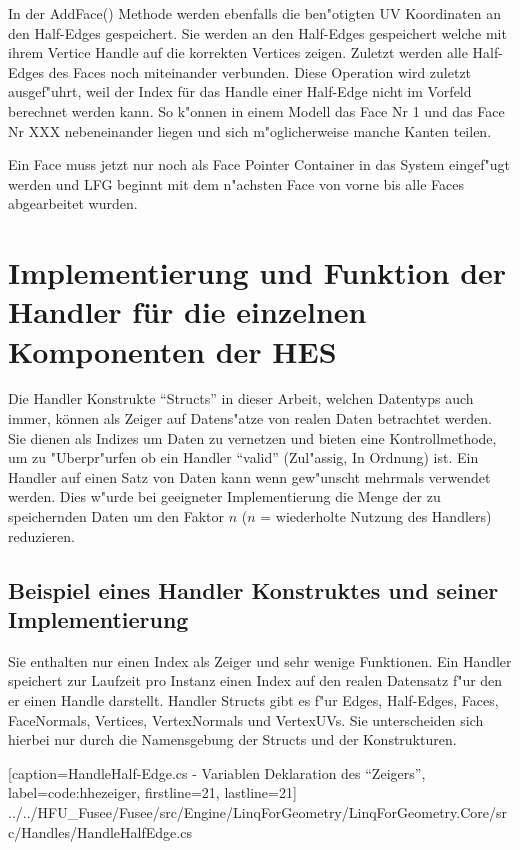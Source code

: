 \documentclass[pagesize, paper=a4, fontsize=12pt,titlepage=true, headings=small, headnosepline, abstractoff, liststotoc, nochapterprefix, plainheadsepline]{scrreprt}
\begin{document}
In der AddFace() Methode werden ebenfalls die ben"otigten UV Koordinaten an den Half-Edges gespeichert. Sie werden an den Half-Edges gespeichert welche mit ihrem Vertice Handle auf die korrekten Vertices zeigen. Zuletzt werden alle Half-Edges des Faces noch miteinander verbunden. Diese Operation wird zuletzt ausgef"uhrt, weil der Index für das Handle einer Half-Edge nicht im Vorfeld berechnet werden kann. So k"onnen in einem Modell das Face Nr 1 und das Face Nr XXX nebeneinander liegen und sich m"oglicherweise manche Kanten teilen.

Ein Face muss jetzt nur noch als Face Pointer Container in das System eingef"ugt werden und LFG beginnt mit dem n"achsten Face von vorne bis alle Faces abgearbeitet wurden.


	\section {Implementierung und Funktion der Handler für die einzelnen Komponenten der HES}
Die Handler Konstrukte "`Structs"' in dieser Arbeit, welchen Datentyps auch immer, können als Zeiger auf Datens"atze von realen Daten betrachtet werden. Sie dienen als Indizes um Daten zu vernetzen und bieten eine Kontrollmethode, um zu "Uberpr"urfen ob ein Handler "`valid"' (Zul"assig, In Ordnung) ist. Ein Handler auf einen Satz von Daten kann wenn gew"unscht mehrmals verwendet werden. Dies w"urde bei geeigneter Implementierung die Menge der zu speichernden Daten um den Faktor \(n\) (\(n\) = wiederholte Nutzung des Handlers) reduzieren.
		\subsection {Beispiel eines Handler Konstruktes und seiner Implementierung}
Sie enthalten nur einen Index als Zeiger und sehr wenige Funktionen. Ein Handler speichert zur Laufzeit pro Instanz einen Index auf den realen Datensatz f"ur den er einen Handle darstellt. Handler Structs gibt es f"ur Edges, Half-Edges, Faces, FaceNormals, Vertices, VertexNormals und VertexUVs. Sie unterscheiden sich hierbei nur durch die Namensgebung der Structs und der Konstrukturen.

			[caption={HandleHalf-Edge.cs - Variablen Deklaration des "`Zeigers"'}, label=code:hhezeiger, firstline=21, lastline=21]
			{../../HFU_Fusee/Fusee/src/Engine/LinqForGeometry/LinqForGeometry.Core/src/Handles/HandleHalfEdge.cs}
\end{document}
